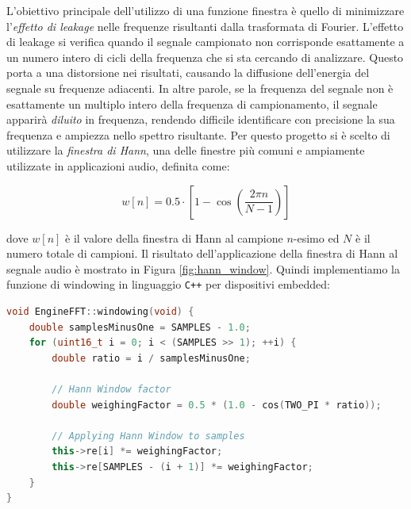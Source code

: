 \documentclass[a4paper,12pt]{report}  %
\newcommand{\lstinlinebg}[1]{\colorbox{backcolour}{\lstinline|#1|}}
\begin{document}
L'obiettivo principale dell'utilizzo di una funzione finestra è quello di minimizzare l'\textit{eﬀetto di leakage} nelle frequenze risultanti dalla trasformata di Fourier.
L'effetto di leakage si verifica quando il segnale campionato non corrisponde esattamente a un numero intero di cicli della frequenza che si sta cercando di analizzare.
Questo porta a una distorsione nei risultati, causando la diffusione dell'energia del segnale su frequenze adiacenti.
In altre parole, se la frequenza del segnale non è esattamente un multiplo intero della frequenza di campionamento, il segnale apparirà \textit{diluito} in frequenza, rendendo difficile identificare con precisione la sua frequenza e ampiezza nello spettro risultante.
Per questo progetto si è scelto di utilizzare la \textit{finestra di Hann}, una delle finestre più comuni e ampiamente utilizzate in applicazioni audio, definita come:

\begin{equation}
    w[n] = 0.5 \cdot \left [ 1 - \cos \left( \frac{2 \pi n}{N - 1} \right) \right ] \nonumber
\end{equation}

dove $w[n]$ è il valore della finestra di Hann al campione $n$-esimo ed $N$ è il numero totale di campioni.
Il risultato dell'applicazione della finestra di Hann al segnale audio è mostrato in Figura \ref{fig:hann_window}.
Quindi implementiamo la funzione di windowing in linguaggio \lstinlinebg{C++} per dispositivi embedded:

\begin{lstlisting}[language=C++,keywords={void, double, float, this, uint16_t, this, for, cos, TWO_PI}]
void EngineFFT::windowing(void) {
    double samplesMinusOne = SAMPLES - 1.0;
    for (uint16_t i = 0; i < (SAMPLES >> 1); ++i) {
        double ratio = i / samplesMinusOne;
    
        // Hann Window factor
        double weighingFactor = 0.5 * (1.0 - cos(TWO_PI * ratio));
    
        // Applying Hann Window to samples
        this->re[i] *= weighingFactor;
        this->re[SAMPLES - (i + 1)] *= weighingFactor;
    }
}
\end{lstlisting}
\end{document}
